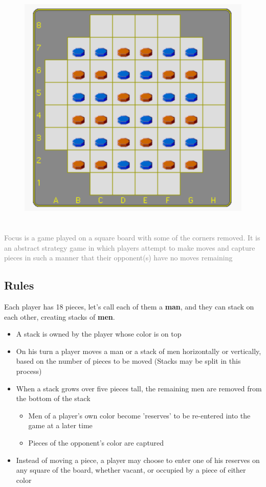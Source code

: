 \documentclass[a4paper, 11pt]{article}
\begin{document}
\par


\begin{figure}[htp]
    \centering
    \includegraphics[width=15cm, height=12cm]{board-img}
    \caption{}
    \label{fig:Focus}
\end{figure}
\vspace{10pt}
\textcolor{gray}{
Focus is a game played on a square board with some of the corners removed.
It is an abstract strategy game in which players attempt to make moves and
capture pieces in such a manner that their opponent(s) have no moves remaining
}
\subsection{Rules}
Each player has 18 pieces, let's call each of them a \textbf{man}, and they can stack on each other, creating stacks of \textbf{men}. \par

\begin{itemize}
    \item A stack is owned by the player whose color is on top
    \item On his turn a player moves a man or a stack of men horizontally or vertically, based on the number of pieces to be moved (Stacks may be split in this process)
    \item When a stack grows over five pieces tall, the remaining men are removed from the bottom of the stack
    \begin{itemize}
        \item Men of a player's own color become 'reserves' to be re-entered into the game at a later time
        \item Pieces of the opponent's color are captured
    \end{itemize}
    \item Instead of moving a piece, a player may choose to enter one of his reserves on any square of the board, whether vacant, or occupied by a piece of either color
\end{itemize}
\end{document}
